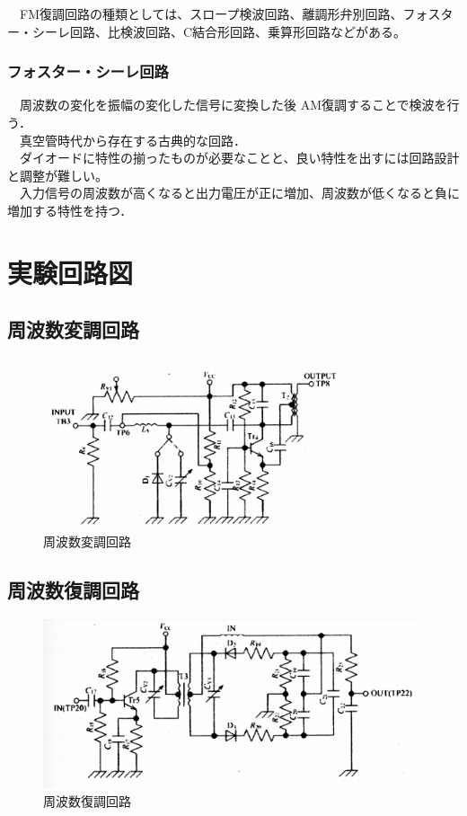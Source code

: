 　FM復調回路の種類としては、スロープ検波回路、離調形弁別回路、フォスター・シーレ回路、比検波回路、C結合形回路、乗算形回路などがある。\\

\subsubsection{フォスター・シーレ回路}
　周波数の変化を振幅の変化した信号に変換した後 AM復調することで検波を行う．\\
　真空管時代から存在する古典的な回路．\\
　ダイオードに特性の揃ったものが必要なことと、良い特性を出すには回路設計と調整が難しい。\\
　入力信号の周波数が高くなると出力電圧が正に増加、周波数が低くなると負に増加する特性を持つ．\\

\section{実験回路図}
\subsection{周波数変調回路}
\begin{figure}[H]
  \centering
  \includegraphics[height=5cm]{./data/3.png}
  \caption{周波数変調回路}
\end{figure}

\subsection{周波数復調回路}
\begin{figure}[H]
  \centering
  \includegraphics[height=5cm]{./data/4.png}
  \caption{周波数復調回路}
\end{figure}

